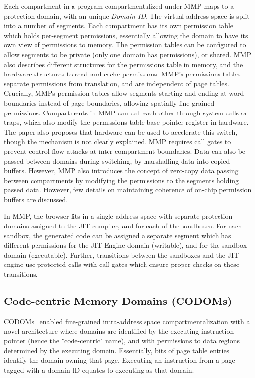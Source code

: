 Each compartment in a program compartmentalized under MMP maps to a protection
domain, with an unique \emph{Domain ID}.
The virtual address space is split into a number of segments.
Each compartment has its own permission table which holds per-segment permissions,
essentially allowing the domain to have its own view of permissions to memory.
The permission tables can be configured to allow segments to be private (only one 
domain has permissions), or shared.
MMP also describes different structures for the permissions table in memory, and
the hardware structures to read and cache permissions.
MMP's permissions tables separate permissions from translation, and are
independent of page tables.
Crucially, MMPs permission tables allow segments starting and ending at
word boundaries instead of page boundaries, allowing spatially fine-grained
permissions.
Compartments in MMP can call each other through system calls or traps, 
which also modify the permissions table base pointer register in hardware.
The paper also proposes that hardware can be used to accelerate this switch,
though the mechanism is not clearly explained.
MMP requires call gates to prevent control flow attacks at inter-compartment
boundaries.
Data can also be passed between domains during switching, by marshalling
data into copied buffers.
However, MMP also introduces the concept of zero-copy data passing between
compartments by modifying the permissions to the segments holding passed data.
However, few details on maintaining coherence of on-chip permission buffers 
are discussed.

In MMP, the browser fits in a single address space with separate protection 
domains assigned to the JIT compiler, and for each of the sandboxes.
For each sandbox, the generated code can be assigned a separate segment
which has different permissions for the JIT Engine domain (writable), 
and for the sandbox domain (executable).
Further, transitions between the sandboxes and the JIT engine use protected
calls with call gates which ensure proper checks on these transitions.

\subsection{Code-centric Memory Domains (CODOMs)}
CODOMs~\cite{VilanovaBNEV14} enabled fine-grained intra-address space 
compartmentalization
with a novel architecture where domains are identified by the executing
instruction pointer (hence the "code-centric" name), and with permissions
to data regions determined by the executing domain. 
Essentially, bits of page table entries identify the domain owning that
page.
Executing an instruction from a page tagged with a domain ID equates to
executing as that domain.

